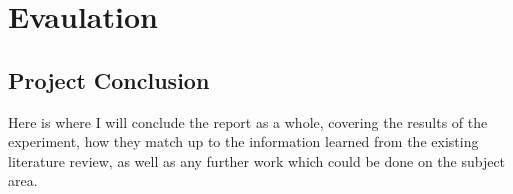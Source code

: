 \chapter{Evaulation}
\label{eval}

\section{Project Conclusion}
Here is where I will conclude the report as a whole, covering the results of the experiment, how they match up to the information learned from the existing literature review, as well as any further work which could be done on the subject area.
